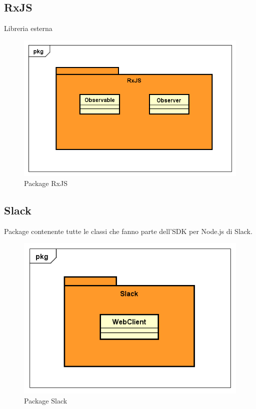 \subsection{RxJS}
Libreria esterna
\begin{figure}[h] \centering \includegraphics[width=\textwidth,height=\textheight,keepaspectratio]{images/diagrams/back-end/Official_Backend_0304/RxJS.png}
\caption{Package RxJS}
\end{figure}
\newpage

\subsection{Slack}
Package contenente tutte le classi che fanno parte dell'SDK per Node.js di Slack.
\begin{figure}[h] \centering \includegraphics[width=\textwidth,height=\textheight,keepaspectratio]{images/diagrams/back-end/Official_Backend_0304/Slack.png}
\caption{Package Slack}
\end{figure}
\newpage


